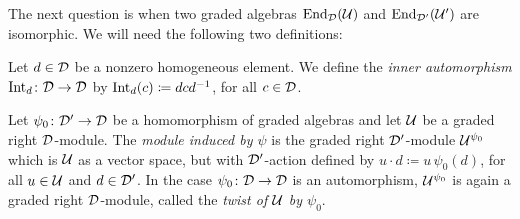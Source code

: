 

The next question is when two graded algebras $\operatorname{End}_{\mathcal{D}} (\mathcal U)$ and $\operatorname{End}_{\mathcal{D}'} (\mathcal U')$ are isomorphic. 
We will need the following two definitions:

\begin{defi}\label{def:inner-automorphism}
	Let $d\in \mathcal{D}$ be a nonzero homogeneous element.
	We define the \emph{inner automorphism} $\operatorname{Int}_d\colon \mathcal{D} \to \mathcal{D}$ by $\operatorname{Int}_d (c) \coloneqq dcd^{-1}$, for all $c\in \mathcal{D}$.
\end{defi}

\begin{defi}\label{def:twist}
	Let $\psi_0\colon \mathcal{D}' \to \mathcal{D}$ be a homomorphism of graded algebras and let $\mathcal U$ be a graded right $\mathcal{D}$-module.
	The \emph{module induced by $\psi$} is the graded right $\mathcal{D}'$-module $\mathcal U^{\psi_0}$ which is $\mathcal U$ as a vector space, but with $\mathcal{D}'$-action defined by $u\cdot d \coloneqq u\,\psi_0 (d)$, for all $u\in \mathcal U$ and $d\in \mathcal{D}'$.
	In the case $\psi_0\colon \mathcal{D} \to \mathcal{D}$ is an automorphism, $\mathcal U^{\psi_0}$ is again a graded right $\mathcal{D}$-module, called the \emph{twist of $\mathcal U$ by $\psi_0$}.
\end{defi}

